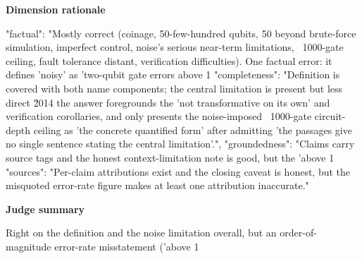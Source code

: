 \documentclass[10pt]{article}
\begin{document}
\textbf{Dimension rationale}
\begin{EvidenceText}
{
  "factual": "Mostly correct (coinage, 50-few-hundred qubits, 50 beyond brute-force simulation, imperfect control, noise's serious near-term limitations, ~1000-gate ceiling, fault tolerance distant, verification difficulties). One factual error: it defines 'noisy' as 'two-qubit gate errors above 1%
  "completeness": "Definition is covered with both name components; the central limitation is present but less direct \u2014 the answer foregrounds the 'not transformative on its own' and verification corollaries, and only presents the noise-imposed ~1000-gate circuit-depth ceiling as 'the concrete quantified form' after admitting 'the passages give no single sentence stating the central limitation'.",
  "groundedness": "Claims carry source tags and the honest context-limitation note is good, but the 'above 1%
  "sources": "Per-claim attributions exist and the closing caveat is honest, but the misquoted error-rate figure makes at least one attribution inaccurate."
}
\end{EvidenceText}

\textbf{Judge summary}
\begin{EvidenceText}
Right on the definition and the noise limitation overall, but an order-of-magnitude error-rate misstatement ('above 1%
\end{EvidenceText}
\end{document}
